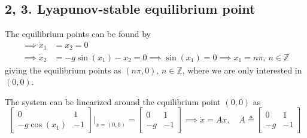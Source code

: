 \subsection*{2, 3. Lyapunov-stable equilibrium point}

The equilibrium points can be found by
\begin{align*}
    \implies
    \dot{x}_{1}
     & =
    x_{2} = 0
    \\
    \implies
    \dot{x}_{2}
     & =
    -g \sin (x_{1}) - x_{2} = 0
    \implies
    \sin (x_{1}) = 0
    \implies
    x_{1} = n \pi, \ n \in \mathbb{Z}
\end{align*}
giving the equilibrium points as \( (n \pi, 0) \), \( n \in \mathbb{Z} \), where we are only interested in \( (0, 0) \).

The system can be linearized around the equilibrium point \( (0, 0) \) as
\[
    \begin{bmatrix}
        0             & 1  \\
        -g \cos (x_1) & -1
    \end{bmatrix} \Bigg|_{x = (0, 0)}
    =
    \begin{bmatrix}
        0  & 1  \\
        -g & -1
    \end{bmatrix}
    \implies
    \dot x = Ax, \quad
    A \triangleq \begin{bmatrix} 0 & 1 \\ -g & -1 \end{bmatrix}
\]
